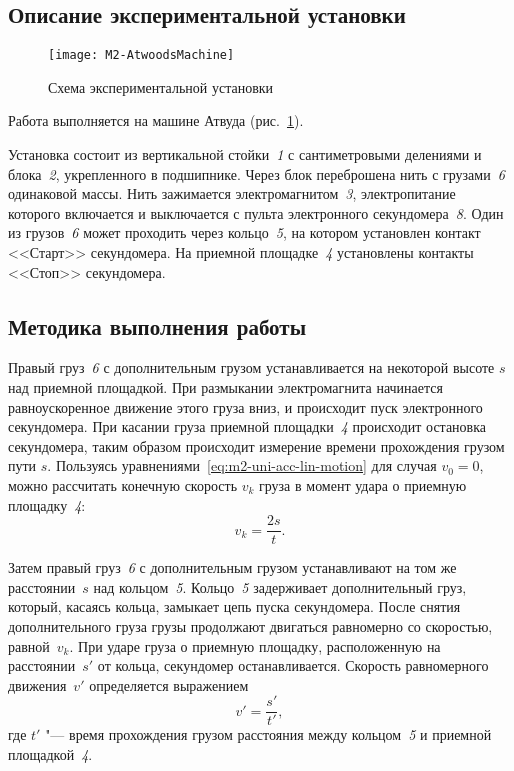 \documentclass[a4paper, 12pt]{extarticle}
\begin{document}
\subsection{Описание экспериментальной установки}
\begin{figure}[h] %
\begin{center}
\texttt{[image: M2-AtwoodsMachine]}
\end{center}
\caption{Схема экспериментальной установки \label{fig:m2-atwood-machine}}
\end{figure}
Работа выполняется на машине Атвуда (рис.~\ref{fig:m2-atwood-machine}).

Установка состоит из вертикальной стойки~\emph{1} с сантиметровыми делениями и блока~\emph{2}, укрепленного в подшипнике. Через блок переброшена нить с грузами~\emph{6} одинаковой массы. Нить зажимается электромагнитом~\emph{3}, электропитание которого включается и выключается с пульта электронного секундомера~\emph{8}. Один из грузов~\emph{6} может проходить через кольцо~\emph{5}, на котором установлен контакт <<Старт>> секундомера. На приемной площадке~\emph{4} установлены контакты <<Стоп>> секундомера.

\subsection{Методика выполнения работы}
Правый груз~\emph{6} с дополнительным грузом устанавливается на некоторой высоте $s$ над приемной площадкой. При размыкании электромагнита начинается равноускоренное движение этого груза вниз, и происходит пуск электронного секундомера. При касании груза приемной площадки~\emph{4} происходит остановка секундомера, таким образом происходит измерение времени прохождения грузом пути $s$. Пользуясь уравнениями~\eqref{eq:m2-uni-acc-lin-motion} для случая $v_0 = 0$, можно рассчитать конечную скорость $v_k$ груза в момент удара о приемную площадку~\emph{4}:
\begin{equation}
\label{eq:m2-final-speed}
v_k = \frac{2s}{t}.
\end{equation}

Затем правый груз~\emph{6} с дополнительным грузом устанавливают на том же расстоянии~$s$ над кольцом~\emph{5}. Кольцо~\emph{5} задерживает дополнительный груз, который, касаясь кольца, замыкает цепь пуска секундомера. После снятия дополнительного груза грузы продолжают двигаться равномерно со скоростью, равной~$v_k$. При ударе груза о приемную площадку, расположенную на расстоянии~$s'$ от кольца, секундомер останавливается. Скорость равномерного движения~$v'$ определяется выражением
\begin{equation}
\label{eq:m2-constant-motion-speed}
v' = \frac{s'}{t'},
\end{equation}
где $t'$ "--- время прохождения грузом расстояния между кольцом~\emph{5} и приемной площадкой~\emph{4}. %
\end{document}
